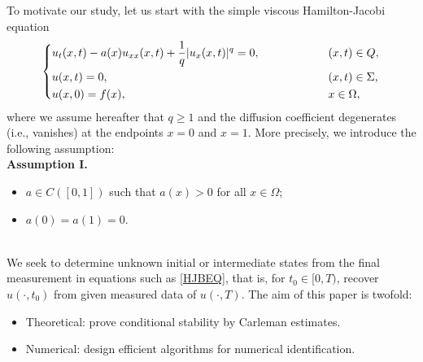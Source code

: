 \documentclass[reqno]{amsart}
\theoremstyle{plain}
\theoremstyle{remark}
\numberwithin{equation}{section}
\begin{document}
To motivate our study, let us start with the simple viscous Hamilton-Jacobi equation 
\begin{equation}
\left\{
\begin{aligned}
& u_{t}(x,t) - a(x) u_{xx}(x,t)+ \frac{1}{q}\vert u_{x}(x,t)\vert^q= 0, &&(x,t)\in Q,\\
&u(x,t)=0,\hspace{6.5cm} &&(x,t)\in \Sigma,\\
&u(x,0)=f(x), && x\in \Omega,
\end{aligned}\label{HJBEQ}
\right.
\end{equation}
where we assume hereafter that $q \geqslant 1$ and the diffusion coefficient degenerates (i.e., vanishes) at the endpoints $x=0$ and $x=1$. More precisely, we introduce the following assumption:\\
\noindent\textbf{Assumption I.}
\begin{itemize}
    \item[(i)] $a\in C([0,1])$ such that $a(x)>0$ for all $x\in \Omega$;
    \item[(ii)] $a(0)=a(1)=0$.
\end{itemize}
\bigskip

\\
We seek to determine unknown initial or intermediate states from the final measurement in equations such as \eqref{HJBEQ}, that is, for $t_0\in [0,T)$, recover $u(\cdot,t_0)$ from given measured data of $u(\cdot,T)$. The aim of this paper is twofold:
\begin{itemize}
    \item[(i)] Theoretical: prove conditional stability by Carleman estimates.
    \item[(ii)] Numerical: design efficient algorithms for numerical identification.
\end{itemize}
\end{document}
